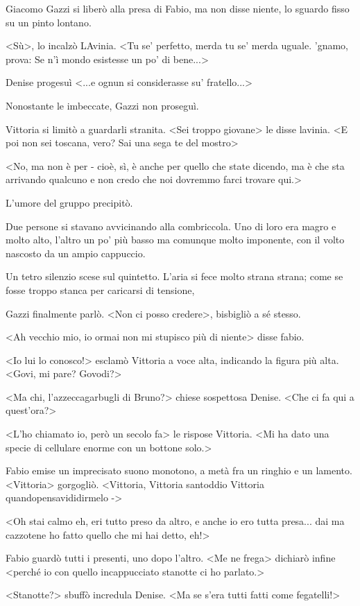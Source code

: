 Giacomo Gazzi si liberò alla presa di Fabio, ma non disse niente, lo sguardo fisso su un pinto lontano. 

<Sù>, lo incalzò LAvinia. <Tu se' perfetto, merda tu se' merda uguale. 'gnamo, prova: Se n'ì mondo esistesse un po' di bene...>

Denise progesuì <...e ognun si considerasse su' fratello...>

Nonostante le imbeccate, Gazzi non proseguì.

Vittoria si limitò a guardarli stranita. <Sei troppo giovane> le disse lavinia. <E poi non sei toscana, vero? Sai una sega te del mostro>

<No, ma non è per - cioè, sì, è anche per quello che state dicendo, ma è che sta arrivando qualcuno e non credo che noi dovremmo farci trovare qui.> 

L'umore del gruppo precipitò.

Due persone si stavano avvicinando alla combriccola. Uno di loro era magro e molto alto, l'altro un po' più basso ma comunque molto imponente, con il volto nascosto da un ampio cappuccio.

Un tetro silenzio scese sul quintetto. L'aria si fece molto strana strana; come se fosse troppo stanca per caricarsi di tensione, 

Gazzi finalmente parlò. <Non ci posso credere>, bisbigliò a sé stesso.

<Ah vecchio mio, io ormai non mi stupisco più di niente> disse fabio.

<Io lui lo conosco!> esclamò Vittoria a voce alta, indicando la figura più alta. <Govi, mi pare? Govodi?>

<Ma chi, l'azzeccagarbugli di Bruno?> chiese sospettosa Denise. <Che ci fa qui a quest'ora?>

<L'ho chiamato io, però un secolo fa> le rispose Vittoria. <Mi ha dato una specie di cellulare enorme con un bottone solo.>

Fabio emise un imprecisato suono monotono, a metà fra un ringhio e un lamento.<Vittoria> gorgogliò. <Vittoria, Vittoria santoddio Vittoria quandopensavididirmelo ->

<Oh stai calmo eh, eri tutto preso da altro, e anche io ero tutta presa... dai ma cazzotene ho fatto quello che mi hai detto, eh!>

Fabio guardò tutti i presenti, uno dopo l'altro. <Me ne frega> dichiarò infine <perché io con quello incappucciato stanotte ci ho parlato.>

<Stanotte?> sbuffò incredula Denise. <Ma se s'era tutti fatti come fegatelli!>

